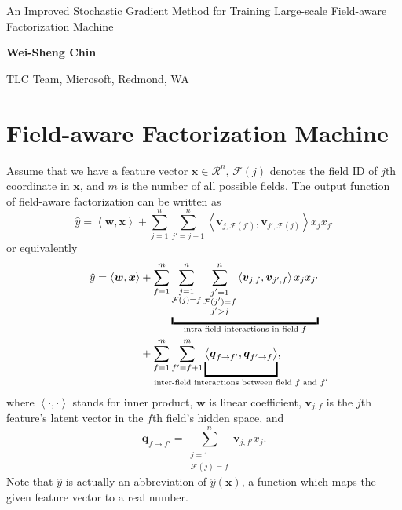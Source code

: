 \documentclass[11pt]{article}
\newcommand{\bsym}[1]{\ensuremath{\boldsymbol{#1}}}
\newcommand{\bw}{\ensuremath{\bsym{w}}}
\newcommand{\bv}{\ensuremath{\bsym{v}}}
\newcommand{\bx}{\ensuremath{\bsym{x}}}
\newcommand{\bq}{\ensuremath{\bsym{q}}}
\newcommand{\bbr}{\ensuremath{\mathcal R}}
\newcommand{\field}{\ensuremath{\mathcal F}}
\newcommand{\dotprod}[2]{\ensuremath{\left\langle #1,#2 \right\rangle}}
\begin{document}
\begin{center}
    {\Large An Improved Stochastic Gradient Method for Training Large-scale Field-aware Factorization Machine}
\end{center}
\begin{center}
    {\bf \large Wei-Sheng Chin}
\end{center}
\begin{center}
{TLC Team, Microsoft, Redmond, WA}\\
\end{center}

\section{Field-aware Factorization Machine}
Assume that we have a feature vector $\bx\in\bbr^n$, $\field(j)$ denotes the field ID of $j$th coordinate in $\bx$, and $m$ is the number of all possible fields.
The output function of field-aware factorization can be written as
\begin{equation*}
    \hat{y} = \dotprod{\bw}{\bx} + \sum_{j=1}^n \sum_{j'=j+1}^n \dotprod{\bv_{j, \field(j')}}{\bv_{j', \field(j)}} x_jx_{j'}
\end{equation*}
or equivalently
\begin{equation}
    \begin{aligned}
        \hat{y} = \dotprod{\bw}{\bx} &+ \sum_{f=1}^m \underbracket[1.5pt][5pt]{\sum_{\substack{j=1 \\ \field(j)=f}}^n \sum_{\substack{j'=1 \\ \field(j') = f \\ j' > j}}^n \dotprod{\bv_{j, f}}{\bv_{j', f}}x_jx_{j'}}_{\text{intra-field interactions in field $f$}} \\
                                 &+ \sum_{f=1}^m\sum_{f'=f+1}^m \underbracket[1.5pt][12pt]{\dotprod{\bq_{f\rightarrow f'}}{\bq_{f'\rightarrow f}}}_{\mathclap{\text{inter-field interactions between field $f$ and $f'$}}},
    \end{aligned}
    \label{eq:FfmOut}
\end{equation}
where $\dotprod{\cdot}{\cdot}$ stands for inner product, $\bw$ is linear coefficient, $\bv_{j, f}$ is the $j$th feature's latent vector in the $f$th field's hidden space, and
\begin{equation*}
    \bq_{f\rightarrow f'} = \sum_{ \substack{j=1 \\ \field(j)=f} }^n \bv_{j, f'} x_j.
\end{equation*}
Note that $\hat{y}$ is actually an abbreviation of $\hat{y}(\bx)$, a function which maps the given feature vector to a real number.
\end{document}
